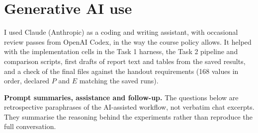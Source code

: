 \section*{Generative AI use}
I used Claude (Anthropic) as a coding and writing assistant, with occasional review passes
from OpenAI Codex, in the way the course policy allows. It helped with the implementation
cells in the Task 1 harness, the Task 2 pipeline and comparison scripts, first drafts of
report text and tables from the saved results, and a check of the final files against the
handout requirements (168 values in order, declared $P$ and $E$ matching the saved runs).

\textbf{Prompt summaries, assistance and follow-up.}
The questions below are retrospective paraphrases of the AI-assisted workflow, not
verbatim chat excerpts. They summarise the reasoning behind the experiments rather
than reproduce the full conversation.
